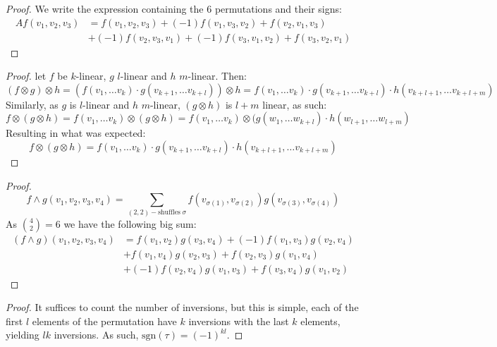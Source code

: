 \begin{customprob}{3.15}
\end{customprob}
\begin{proof}
	We write the expression containing the 6 permutations and their signs:
	\begin{align*}
		A f(v_1,v_2,v_3) & = f(v_1,v_2,v_3) + (-1)f(v_1,v_3,v_2) + f(v_2, v_1, v_3)         \\
		                 & + (-1)f(v_2, v_3, v_1) + (-1)f(v_3, v_1, v_2) + f(v_3, v_2, v_1)
	\end{align*}
\end{proof}


\begin{customprob}{3.17}
\end{customprob}
\begin{proof}
	let $f$ be $k$-linear, $g$ $l$-linear and $h$ $m$-linear. Then:
	$$(f \otimes g) \otimes h = (f(v_1, \dots v_k)\cdot g(v_{k+1}, \dots v_{k+l})) \otimes h =
		f(v_1, \dots v_k)\cdot g(v_{k+1}, \dots v_{k+l}) \cdot h(v_{k+l+1}, \dots v_{k+l+m})$$
	Similarly, as $g$ is $l$-linear and $h$ $m$-linear, $(g \otimes h)$ is $l+m$ linear, as such:
	$$f \otimes (g \otimes h) = f(v_1, \dots v_k) \otimes (g\otimes h) =
		f(v_1, \dots v_k) \otimes (g(w_{1}, \dots w_{k+l}) \cdot h(w_{l+1}, \dots w_{l+m})$$
	Resulting in what was expected:
	$$f \otimes (g \otimes h) = f(v_1, \dots v_k)\cdot g(v_{k+1}, \dots v_{k+l}) \cdot h(v_{k+l+1}, \dots v_{k+l+m}) $$
\end{proof}

\begin{customprob}{3.20}
\end{customprob}
\begin{proof}
	$$f \wedge g (v_1,v_2,v_3,v_4) = \sum_{(2,2)-\text{shuffles}\;\sigma} f(v_{\sigma(1)}, v_{\sigma(2)})g(v_{\sigma(3)}, v_{\sigma(4)})$$
	As $\binom{4}{2} = 6$ we have the following big sum:
	\begin{align*}
		(f \wedge g) (v_1,v_2,v_3,v_4) & = f(v_{1}, v_{2})g(v_{3}, v_{4}) + (-1)f(v_{1}, v_{3})g(v_{2}, v_{4}) \\
		                               & + f(v_1,v_4)g(v_2,v_3) + f(v_2,v_3)g(v_1,v_4)                         \\
		                               & + (-1)f(v_2, v_4)g(v_1,v_3) + f(v_3,v_4)g(v_1,v_2)
	\end{align*}
\end{proof}


\begin{customprob}{3.22}
\end{customprob}
\begin{proof}
	It suffices to count the number of inversions, but this is simple, each of the first $l$ elements of the permutation
	have $k$ inversions with the last $k$ elements, yielding $lk$ inversions. As such, $\text{sgn}(\tau) = (-1)^{kl}$.
\end{proof}

